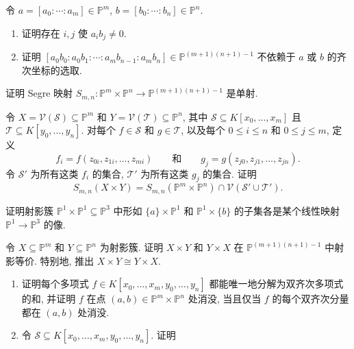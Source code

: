 \BookExerciseHeading
\begin{BookExercises}
  \item\label{ex:segre-map-well-defined} 令 $a=[a_{0}:\cdots:a_{m}]\in\mathbb{P}^{m}$, $b=[b_{0}:\cdots:b_{n}]\in\mathbb{P}^{n}$.
  \begin{enumerate}
    \item 证明存在 $i,j$ 使 $a_{i}b_{j}\ne0$.
    \item 证明 $[a_{0}b_{0}:a_{0}b_{1}:\cdots:a_{m}b_{n-1}:a_{m}b_{n}]\in\mathbb{P}^{(m+1)(n+1)-1}$ 不依赖于 $a$ 或 $b$ 的齐次坐标的选取.
  \end{enumerate}
  \item\label{ex:segre-map-injective} 证明 Segre 映射 $S_{m,n}:\mathbb{P}^{m}\times\mathbb{P}^{n}\to\mathbb{P}^{(m+1)(n+1)-1}$ 是单射.
  \item\label{ex:equations-for-segre-image-of-product} 令 $X=\mathcal{V}(\mathcal{S})\subseteq\mathbb{P}^{m}$ 和 $Y=\mathcal{V}(\mathcal{T})\subseteq\mathbb{P}^{n}$, 其中 $\mathcal{S}\subseteq K[x_{0},\ldots,x_{m}]$ 且 $\mathcal{T}\subseteq K[y_{0},\ldots,y_{n}]$. 对每个 $f\in\mathcal{S}$ 和 $g\in\mathcal{T}$, 以及每个 $0\le i\le n$ 和 $0\le j\le m$, 定义
  \[
    f_{i}=f(z_{0i},z_{1i},\ldots,z_{mi})
    \qquad\text{和}\qquad
    g_{j}=g(z_{j0},z_{j1},\ldots,z_{jn}).
  \]
  令 $\mathcal{S}'$ 为所有这类 $f_{i}$ 的集合, $\mathcal{T}'$ 为所有这类 $g_{j}$ 的集合. 证明
  \[
    S_{m,n}(X\times Y)=S_{m,n}(\mathbb{P}^{m}\times\mathbb{P}^{n})
     \cap\mathcal{V}(\mathcal{S}'\cup\mathcal{T}').
  \]
  \item\label{ex:two-rulings-of-segre-quadric} 证明射影簇 $\mathbb{P}^{1}\times\mathbb{P}^{1}\subseteq\mathbb{P}^{3}$ 中形如 $\{a\}\times\mathbb{P}^{1}$ 和 $\mathbb{P}^{1}\times\{b\}$ 的子集各是某个线性映射 $\mathbb{P}^{1}\to\mathbb{P}^{3}$ 的像.
  \item\label{ex:projective-product-order-swap} 令 $X\subseteq\mathbb{P}^{m}$ 和 $Y\subseteq\mathbb{P}^{n}$ 为射影簇. 证明 $X\times Y$ 和 $Y\times X$ 在 $\mathbb{P}^{(m+1)(n+1)-1}$ 中射影等价. 特别地, 推出 $X\times Y\cong Y\times X$.
  \item\label{ex:bihomogeneous-polynomials-define-vanishing-sets}
  \begin{enumerate}
    \item 证明每个多项式 $f\in K[x_{0},\ldots,x_{m},y_{0},\ldots,y_{n}]$ 都能唯一地分解为双齐次多项式的和, 并证明 $f$ 在点 $(a,b)\in\mathbb{P}^{m}\times\mathbb{P}^{n}$ 处消没, 当且仅当 $f$ 的每个双齐次分量都在 $(a,b)$ 处消没.
    \item 令 $\mathcal{S}\subseteq K[x_{0},\ldots,x_{m},y_{0},\ldots,y_{n}]$. 证明

\end{enumerate}
\end{BookExercises}
